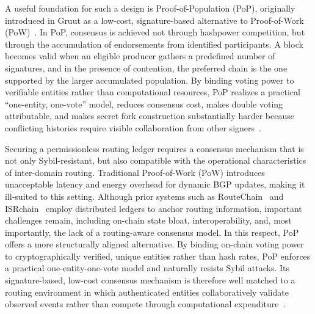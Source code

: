 \documentclass[conference]{IEEEtran}
\begin{document}
A useful foundation for such a design is Proof-of-Population (PoP), originally introduced in Gruut as a low-cost, signature-based alternative to Proof-of-Work (PoW)~\cite{nyang2018gruut}. In PoP, consensus is achieved not through hashpower competition, but through the accumulation of endorsements from identified participants. A block becomes valid when an eligible producer gathers a predefined number of signatures, and in the presence of contention, the preferred chain is the one supported by the larger accumulated population. By binding voting power to verifiable entities rather than computational resources, PoP realizes a practical ``one-entity, one-vote'' model, reduces consensus cost, makes double voting attributable, and makes secret fork construction substantially harder because conflicting histories require visible collaboration from other signers~\cite{nyang2018gruut}.

Securing a permissionless routing ledger requires a consensus mechanism that is not only Sybil-resistant, but also compatible with the operational characteristics of inter-domain routing. Traditional Proof-of-Work (PoW) introduces unacceptable latency and energy overhead for dynamic BGP updates, making it ill-suited to this setting. Although prior systems such as RouteChain~\cite{saad2022routechain} and ISRchain~\cite{chen2020isrchain} employ distributed ledgers to anchor routing information, important challenges remain, including on-chain state bloat, interoperability, and, most importantly, the lack of a routing-aware consensus model. In this respect, PoP offers a more structurally aligned alternative. By binding on-chain voting power to cryptographically verified, unique entities rather than hash rates, PoP enforces a practical one-entity-one-vote model and naturally resists Sybil attacks. Its signature-based, low-cost consensus mechanism is therefore well matched to a routing environment in which authenticated entities collaboratively validate observed events rather than compete through computational expenditure~\cite{nyang2018gruut}.
\end{document}
